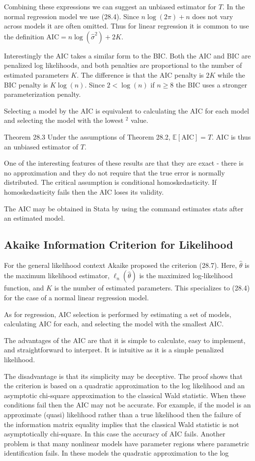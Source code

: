 \documentclass[10pt]{article}
\begin{document}
Combining these expressions we can suggest an unbiased estimator for $T$. In the normal regression model we use (28.4). Since $n \log (2 \pi)+n$ does not vary across models it are often omitted. Thus for linear regression it is common to use the definition $\mathrm{AIC}=n \log \left(\widehat{\sigma}^{2}\right)+2 K$.

Interestingly the AIC takes a similar form to the BIC. Both the AIC and BIC are penalized log likelihoods, and both penalties are proportional to the number of estimated parameters $K$. The difference is that the AIC penalty is $2 K$ while the BIC penalty is $K \log (n)$. Since $2<\log (n)$ if $n \geq 8$ the BIC uses a stronger parameterization penalty.

Selecting a model by the AIC is equivalent to calculating the AIC for each model and selecting the model with the lowest ${ }^{2}$ value.

Theorem 28.3 Under the assumptions of Theorem 28.2, $\mathbb{E}[\mathrm{AIC}]=T$. AIC is thus an unbiased estimator of $T$.

One of the interesting features of these results are that they are exact - there is no approximation and they do not require that the true error is normally distributed. The critical assumption is conditional homoskedasticity. If homoskedasticity fails then the AIC loses its validity.

The AIC may be obtained in Stata by using the command estimates stats after an estimated model.

\subsection{Akaike Information Criterion for Likelihood}
For the general likelihood context Akaike proposed the criterion (28.7). Here, $\widehat{\theta}$ is the maximum likelihood estimator, $\ell_{n}(\widehat{\theta})$ is the maximized log-likelihood function, and $K$ is the number of estimated parameters. This specializes to (28.4) for the case of a normal linear regression model.

As for regression, AIC selection is performed by estimating a set of models, calculating AIC for each, and selecting the model with the smallest AIC.

The advantages of the AIC are that it is simple to calculate, easy to implement, and straightforward to interpret. It is intuitive as it is a simple penalized likelihood.

The disadvantage is that its simplicity may be deceptive. The proof shows that the criterion is based on a quadratic approximation to the log likelihood and an asymptotic chi-square approximation to the classical Wald statistic. When these conditions fail then the AIC may not be accurate. For example, if the model is an approximate (quasi) likelihood rather than a true likelihood then the failure of the information matrix equality implies that the classical Wald statistic is not asymptotically chi-square. In this case the accuracy of AIC fails. Another problem is that many nonlinear models have parameter regions where parametric identification fails. In these models the quadratic approximation to the log
\end{document}
